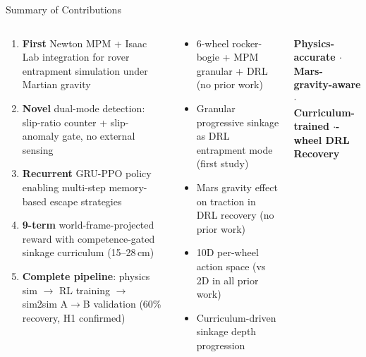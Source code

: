 \documentclass[aspectratio=169, 10pt]{beamer}
\newcommand{\keyword}[1]{\textbf{\color{MarsLight}#1}}
\newcommand{\tick}{\textcolor{AccentGreen}{\faCheckCircle}}
\begin{document}
\begin{frame}{Summary of Contributions}
\vspace{0.3em}
\begin{columns}[T]

\begin{tcolorbox}[mycard, title={\faStar\; Technical Contributions}]
  \scriptsize
  \begin{enumerate}[leftmargin=1.5em, itemsep=5pt,
                    label={\color{MarsLight}\bfseries\arabic*.}]
    \item \keyword{First} Newton MPM + Isaac Lab integration for rover
      entrapment simulation under Martian gravity
    \item \keyword{Novel} dual-mode detection: slip-ratio counter +
      slip-anomaly gate, no external sensing
    \item \keyword{Recurrent} GRU-PPO policy enabling multi-step
      memory-based escape strategies
    \item \keyword{9-term} world-frame-projected reward with competence-gated
      sinkage curriculum (15–28\,cm)
    \item \keyword{Complete pipeline}: physics sim $\to$ RL training $\to$
      sim2sim A$\to$B validation (60\% recovery, H1 confirmed)
  \end{enumerate}
\end{tcolorbox}


\begin{tcolorbox}[mycard, title={\faChartPie\; Research Gaps Addressed}]
  \scriptsize
  \begin{itemize}[leftmargin=1em, itemsep=4pt]
    \item[\tick] 6-wheel rocker-bogie + MPM granular + DRL
      (no prior work)
    \item[\tick] Granular progressive sinkage as DRL entrapment mode
      (first study)
    \item[\tick] Mars gravity effect on traction in DRL recovery
      (no prior work)
    \item[\tick] 10D per-wheel action space (vs 2D in all prior work)
    \item[\tick] Curriculum-driven sinkage depth progression
  \end{itemize}
\end{tcolorbox}

\vspace{0.3em}
\begin{tcolorbox}[statbox]
  \centering\scriptsize
  \textbf{\color{ArcticTeal}Physics-accurate\; $\cdot$\; Mars-gravity-aware\; $\cdot$}\\
  \textbf{\color{ArcticTeal}Curriculum-trained\; $\cdot$-wheel DRL Recovery}
\end{tcolorbox}

\end{columns}
\end{frame}
\end{document}
